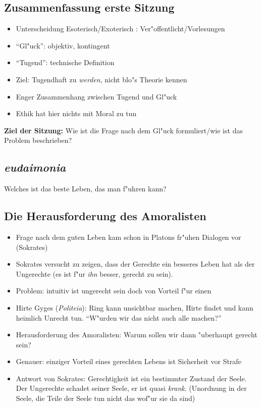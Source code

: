 \documentclass[emulatestandardclasses]{scrartcl}
\begin{document}
\subsection{Zusammenfassung erste Sitzung}

\begin{itemize}
  \item Unterscheidung Esoterisch/Exoterisch : Ver"offentlicht/Vorlesungen
  \item "`Gl"uck"': objektiv, kontingent
  \item "`Tugend"': technische Definition
  \item Ziel: Tugendhaft zu \emph{werden}, nicht blo"s Theorie kennen
  \item Enger Zusammenhang zwischen Tugend und Gl"uck
  \item Ethik hat hier nichts mit Moral zu tun
\end{itemize}

\noindent \textbf{Ziel der Sitzung:} Wie ist die Frage nach dem Gl"uck formuliert/wie ist das Problem beschrieben?

\subsection{\emph{eudaimonia}}

\begin{description}[leftmargin=!,labelwidth=\widthof{\bfseries Frage nach dem Gl"uck}]
  \item[Frage nach dem Gl"uck] Welches ist das beste Leben, das man f"uhren kann?
\end{description}


\subsection{Die Herausforderung des Amoralisten}

\begin{itemize}
  \item Frage nach dem guten Leben kam schon in Platons fr"uhen Dialogen vor (Sokrates)
  \item Sokrates versucht zu zeigen, dass der Gerechte ein besseres Leben hat als der Ungerechte (es ist f"ur \emph{ihn} besser, gerecht zu sein).
  \item Problem: intuitiv ist ungerecht sein doch von Vorteil f"ur einen
  \item Hirte Gyges (\emph{Politeia}): Ring kann unsichtbar machen, Hirte findet und kann heimlich Unrecht tun. "`W"urden wir das nicht auch alle machen?"'
  \item Herausforderung des Amoralisten: Warum sollen wir dann "uberhaupt gerecht sein?
  \item Genauer: einziger Vorteil eines gerechten Lebens ist Sicherheit vor Strafe
  \item Antwort von Sokrates: Gerechtigkeit ist ein bestimmter Zustand der Seele. Der Ungerechte schadet seiner Seele, er ist quasi \emph{krank}. (Unordnung in der Seele, die Teile der Seele tun nicht das wof"ur sie da sind)
\end{itemize}
\end{document}

